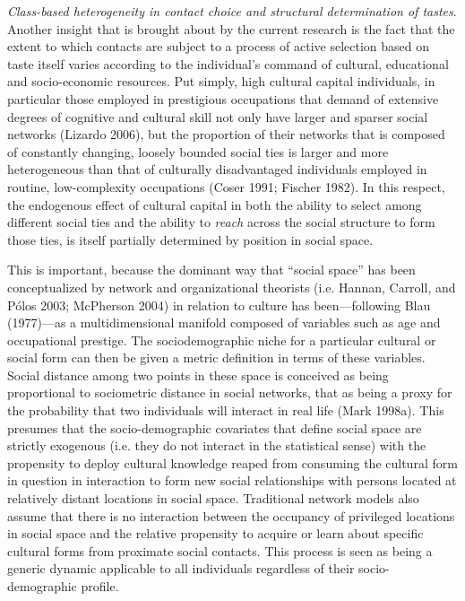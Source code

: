 \emph{Class-based heterogeneity in contact choice and structural determination of tastes}. Another insight that is brought about by the current research is the fact that the extent to which contacts are subject to a process of active selection based on taste itself varies according to the individual's command of cultural, educational and socio-economic resources. Put simply, high cultural capital individuals, in particular those employed in prestigious occupations that demand of extensive degrees of cognitive and cultural skill not only have larger and sparser social networks (Lizardo 2006), but the proportion of their networks that is composed of constantly changing, loosely bounded social ties is larger and more heterogeneous than that of culturally disadvantaged individuals employed in routine, low-complexity occupations (Coser 1991; Fischer 1982). In this respect, the endogenous effect of cultural capital in both the ability to select among different social ties and the ability to \emph{reach} across the social structure to form those ties, is itself partially determined by position in social space.

This is important, because the dominant way that ``social space'' has been conceptualized by network and organizational theorists (i.e. Hannan, Carroll, and Pólos 2003; McPherson 2004) in relation to culture has been---following Blau (1977)---as a multidimensional manifold composed of variables such as age and occupational prestige. The sociodemographic niche for a particular cultural or social form can then be given a metric definition in terms of these variables. Social distance among two points in these space is conceived as being proportional to sociometric distance in social networks, that as being a proxy for the probability that two individuals will interact in real life (Mark 1998a). This presumes that the socio-demographic covariates that define social space are strictly exogenous (i.e. they do not interact in the statistical sense) with the propensity to deploy cultural knowledge reaped from consuming the cultural form in question in interaction to form new social relationships with persons located at relatively distant locations in social space. Traditional network models also assume that there is no interaction between the occupancy of privileged locations in social space and the relative propensity to acquire or learn about specific cultural forms from proximate social contacts. This process is seen as being a generic dynamic applicable to all individuals regardless of their socio-demographic profile.

